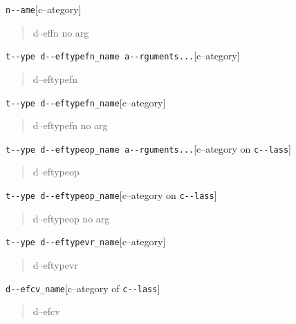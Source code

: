 \documentclass{book}
\begin{document}
\begin{titlepage}
\noindent\texttt{n{-}{-}ame}\hfill[c--ategory]



%
\begin{quote}
d--effn no arg
\end{quote}

\noindent\texttt{t{-}{-}ype d{-}{-}eftypefn\_name a{-}{-}rguments...}\hfill[c--ategory]



%
\begin{quote}
d--eftypefn
\end{quote}

\noindent\texttt{t{-}{-}ype d{-}{-}eftypefn\_name}\hfill[c--ategory]



%
\begin{quote}
d--eftypefn no arg
\end{quote}

\noindent\texttt{t{-}{-}ype d{-}{-}eftypeop\_name a{-}{-}rguments...}\hfill[c--ategory on \texttt{c{-}{-}lass}]



%
\begin{quote}
d--eftypeop
\end{quote}

\noindent\texttt{t{-}{-}ype d{-}{-}eftypeop\_name}\hfill[c--ategory on \texttt{c{-}{-}lass}]



%
\begin{quote}
d--eftypeop no arg
\end{quote}

\noindent\texttt{t{-}{-}ype d{-}{-}eftypevr\_name}\hfill[c--ategory]



%
\begin{quote}
d--eftypevr
\end{quote}

\noindent\texttt{d{-}{-}efcv\_name}\hfill[c--ategory of \texttt{c{-}{-}lass}]



%
\begin{quote}
d--efcv
\end{quote}


\end{titlepage}
\end{document}

